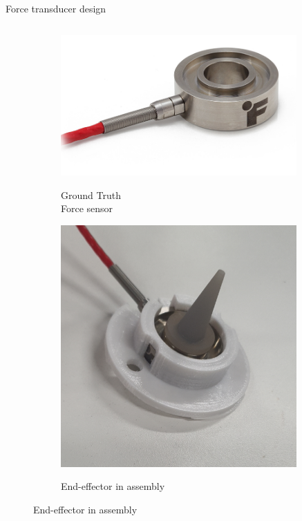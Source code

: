 \documentclass[aspectratio=169]{beamer}
\begin{document}
\begin{frame}[t]{Force transducer design}
\begin{columns}[T,onlytextwidth]
\begin{column}{0.39\textwidth}
            \begin{figure}[H]
                \begin{subfigure}[t]{0.6\textwidth}
                    \centering\includegraphics[width=0.99\textwidth]{LTH350-DONUT-LOAD-CELL-1.png}\\
                    \caption*{\normalsize Ground Truth \\ Force sensor}
                    \label{fig:futek}
                \end{subfigure}
                \vspace{-0.2cm}

                \begin{subfigure}[t]{0.6\textwidth}
                    \centering\includegraphics[width=0.99\textwidth]{point_load.JPG}\\
                    \caption*{\normalsize End-effector in assembly}
                    \label{fig:point_load}
                \end{subfigure}
            \end{figure}


\end{column}
\end{columns}
\end{frame}
\end{document}
